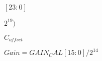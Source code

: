 \documentclass{article}
\begin{document}
$ [23:0]$
\pagebreak

$ 2^{19})$
\pagebreak

$ C_{offset} $
\pagebreak

$ Gain = GAIN_CAL[15:0]/2^{14} $
\pagebreak
\end{document}
